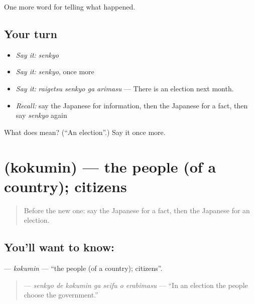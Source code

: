 \begin{grammarlens}[title={What you've built}]
One more word for telling what happened.
\end{grammarlens}

\subsection*{Your turn}
\begin{itemize}
\raggedright
  \item \emph{Say it:} \emph{senkyo}
  \item \emph{Say it:} \emph{senkyo}, once more
  \item \emph{Say it:} \emph{raigetsu senkyo ga arimasu} — There is an election next month.
  \item \emph{Recall:} say the Japanese for information, then the Japanese for a fact, then say \emph{senkyo} again
\end{itemize}

\begin{tcolorbox}[breakable,colback=teal!4,colframe=teal!35!black,title={Before you move on}]
What does  mean? (\textquotedblleft{}An election\textquotedblright{}.) Say it once more.
\end{tcolorbox}
\section[\texorpdfstring{\ja{こくみん} (kokumin)}{こくみん (kokumin)}]{ (kokumin) — the people (of a country); citizens}

\label{lesson:JA-C284-kokumin}



\begin{quote}
Before the new one: say the Japanese for a fact, then the Japanese for an election.
\end{quote}

\subsection*{You'll want to know: }
\textbf{} — \emph{kokumin} — \textquotedblleft{}the people (of a country); citizens\textquotedblright{}.

\begin{quote}
\textbf{   } — \emph{senkyo de kokumin ga seifu o erabimasu} — \textquotedblleft{}In an election the people choose the government.\textquotedblright{}
\end{quote}


